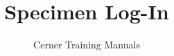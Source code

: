 


\title{Specimen Log-In} %
\author{Cerner Training Manuals}


    \frontmatter
        \maketitle %
        \begin{fullwidth}
            \tableofcontents
        \end{fullwidth}
    \mainmatter
        

    \backmatter


